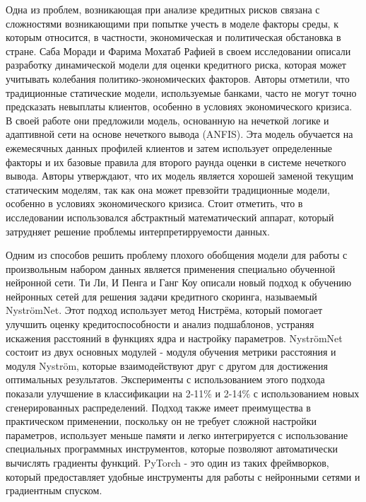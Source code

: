 \documentclass[14pt, letterpaper, twoside]{extarticle}
\begin{document}
Одна из проблем, возникающая при анализе кредитных рисков связана с сложностями возникающими при попытке учесть в моделе факторы среды, к которым относится, в частности, экономическая и политическая обстановка в стране. Саба Моради и Фарима Мохатаб Рафией \cite{moradi2019dynamic} в своем исследовании описали разработку динамической модели для оценки кредитного риска, которая может учитывать колебания политико-экономических факторов. Авторы отметили, что традиционные статические модели, используемые банками, часто не могут точно предсказать невыплаты клиентов, особенно в условиях экономического кризиса. В своей работе они предложили модель, основанную на нечеткой логике и адаптивной сети на основе нечеткого вывода (ANFIS). Эта модель обучается на ежемесячных данных профилей клиентов и затем использует определенные факторы и их базовые правила для второго раунда оценки в системе нечеткого вывода. Авторы утверждают, что их модель является хорошей заменой текущим статическим моделям, так как она может превзойти традиционные модели, особенно в условиях экономического кризиса. Стоит отметить, что в исследовании использовался абстрактный математический аппарат, который затрудняет решение проблемы интерпретирруемости данных.


Одним из способов решить проблему плохого обобщения модели для работы с произвольным набором данных является применения специально обученной нейронной сети. Ти Ли, И Пенга и Ганг Коу \cite{li2023new} описали новый подход к обучению нейронных сетей для решения задачи кредитного скоринга, называемый NyströmNet. Этот подход использует метод Нистрёма, который помогает улучшить оценку кредитоспособности и анализ подшаблонов, устраняя искажения расстояний в функциях ядра и настройку параметров. NyströmNet состоит из двух основных модулей - модуля обучения метрики расстояния и модуля Nyström, которые взаимодействуют друг с другом для достижения оптимальных результатов. Эксперименты с использованием этого подхода показали улучшение в классификации на 2-11\% и 2-14\% с использованием новых сгенерированных распределений. Подход также имеет преимущества в практическом применении, поскольку он не требует сложной настройки параметров, использует меньше памяти и легко интегрируется с использование специальных программных инструментов, которые позволяют автоматически вычислять градиенты функций. PyTorch - это один из таких фреймворков, который предоставляет удобные инструменты для работы с нейронными сетями и градиентным спуском.
\end{document}
